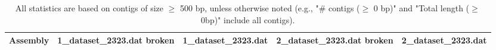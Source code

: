 \documentclass[12pt,a4paper]{article}
\begin{document}
\begin{table}[ht]
\begin{center}
\caption{All statistics are based on contigs of size $\geq$ 500 bp, unless otherwise noted (e.g., "\# contigs ($\geq$ 0 bp)" and "Total length ($\geq$ 0bp)" include all contigs).}
\begin{tabular}{|l*{4}{|r}|}
\hline
Assembly & 1\_dataset\_2323.dat broken & 1\_dataset\_2323.dat & 2\_dataset\_2323.dat broken & 2\_dataset\_2323.dat \\ \hline
\end{tabular}
\end{center}
\end{table}
\end{document}
